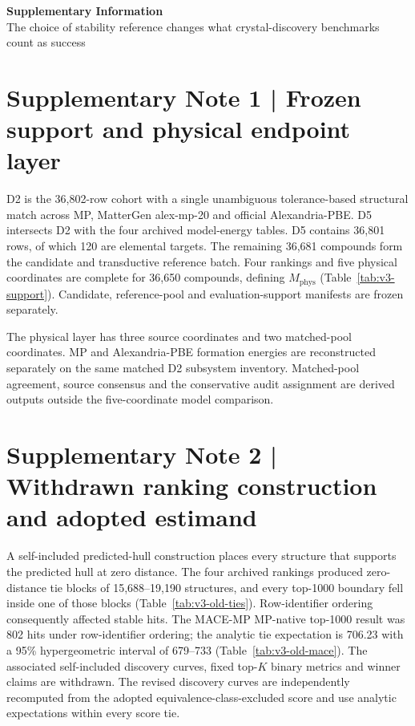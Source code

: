 \documentclass[a4paper,10pt]{article}
\begin{document}
\renewcommand{\thetable}{S\arabic{table}}

\begin{center}
{\Large\bfseries Supplementary Information}\\[3pt]
{\large The choice of stability reference changes what crystal-discovery benchmarks count as success}
\end{center}

\section*{Supplementary Note 1 | Frozen support and physical endpoint layer}
D2 is the 36,802-row cohort with a single unambiguous tolerance-based structural match across MP, MatterGen alex-mp-20 and official Alexandria-PBE. D5 intersects D2 with the four archived model-energy tables. D5 contains 36,801 rows, of which 120 are elemental targets. The remaining 36,681 compounds form the candidate and transductive reference batch. Four rankings and five physical coordinates are complete for 36,650 compounds, defining $M_{\mathrm{phys}}$ (Table~\ref{tab:v3-support}). Candidate, reference-pool and evaluation-support manifests are frozen separately.

The physical layer has three source coordinates and two matched-pool coordinates. MP and Alexandria-PBE formation energies are reconstructed separately on the same matched D2 subsystem inventory. Matched-pool agreement, source consensus and the conservative audit assignment are derived outputs outside the five-coordinate model comparison.




\section*{Supplementary Note 2 | Withdrawn ranking construction and adopted estimand}
A self-included predicted-hull construction places every structure that supports the predicted hull at zero distance. The four archived rankings produced zero-distance tie blocks of 15,688--19,190 structures, and every top-1000 boundary fell inside one of those blocks (Table~\ref{tab:v3-old-ties}). Row-identifier ordering consequently affected stable hits. The MACE-MP MP-native top-1000 result was 802 hits under row-identifier ordering; the analytic tie expectation is 706.23 with a 95\% hypergeometric interval of 679--733 (Table~\ref{tab:v3-old-mace}). The associated self-included discovery curves, fixed top-$K$ binary metrics and winner claims are withdrawn. The revised discovery curves are independently recomputed from the adopted equivalence-class-excluded score and use analytic expectations within every score tie.
\end{document}
